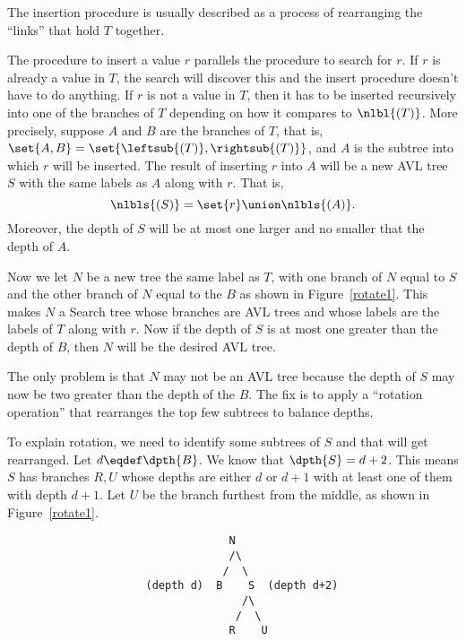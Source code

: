 \begin{definition}
The insertion procedure is usually described as a process of
rearranging the ``links'' that hold $T$ together.
\fi

The procedure to insert a value $r$ parallels the procedure to search
for $r$.  If $r$ is already a value in $T$, the search will discover
this and the insert procedure doesn't have to do anything.  If $r$ is
not a value in $T$, then it has to be inserted recursively into one of
the branches of $T$ depending on how it compares to $\nlbl{(T)}$.
More precisely, suppose $A$ and $B$ are the branches of $T$, that is,
$\set{A,B}= \set{\leftsub{(T)}, \rightsub{(T)}}$, and $A$ is the
subtree into which $r$ will be inserted.  The result of inserting $r$
into $A$ will be a new AVL tree $S$ with the same labels as $A$ along
with $r$.  That is,
\[
\nlbls{(S)} = \set{r} \union \nlbls{(A)}.
\]
Moreover, the depth of $S$ will be at most one larger and no smaller
that the depth of $A$.

Now we let $N$ be a new tree the same label as $T$, with one branch of
$N$ equal to $S$ and the other branch of $N$ equal to the $B$ as shown
in Figure~\ref{rotate1}.  This makes $N$ a Search tree whose branches
are AVL trees and whose labels are the labels of $T$ along with $r$.
Now if the depth of $S$ is at most one greater than the depth of $B$,
then $N$ will be the desired AVL tree.

The only problem is that $N$ may not be an AVL tree because the depth
of $S$ may now be two greater than the depth of the $B$.  The fix is
to apply a ``rotation operation'' that rearranges the top few subtrees
to balance depths.

To explain rotation, we need to identify some subtrees of $S$ and that
will get rearranged.  Let $d \eqdef \dpth{B}$.  We know that $\dpth{S}
= d+2$.  This means $S$ has branches $R,U$ whose depths are either $d$
or $d+1$ with at least one of them with depth $d+1$.  Let $U$ be the
branch furthest from the middle, as shown in Figure~\ref{rotate1}.

\iffalse
where the integer labels indicate the relative sizes of the numerical
labels\fi

\begin{figure}
\begin{verbatim}
                             N
                             /\
                            /  \
                (depth d)  B    S  (depth d+2)
                               /\
                              /  \
                             R    U
\end{verbatim}


\end{figure}
\end{definition}
